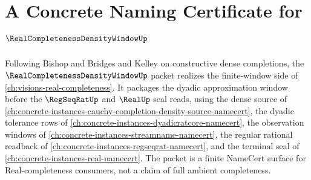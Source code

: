 \chapter{A Concrete Naming Certificate for $\RealCompletenessDensityWindowUp$}
\label{ch:concrete-instances-real-completeness-density-window-namecert}

Following Bishop and Bridges and Kelley on constructive dense completions, the $\RealCompletenessDensityWindowUp$ packet realizes the finite-window side of \autoref{ch:visions-real-completeness}. It packages the dyadic approximation window before the $\RegSeqRatUp$ and $\RealUp$ seal reads, using the dense source of \autoref{ch:concrete-instances-cauchy-completion-density-source-namecert}, the dyadic tolerance rows of \autoref{ch:concrete-instances-dyadicratcore-namecert}, the observation windows of \autoref{ch:concrete-instances-streamname-namecert}, the regular rational readback of \autoref{ch:concrete-instances-regseqrat-namecert}, and the terminal seal of \autoref{ch:concrete-instances-real-namecert}. The packet is a finite NameCert surface for Real-completeness consumers, not a claim of full ambient completeness.

